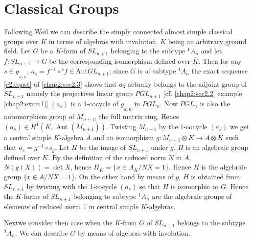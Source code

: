  \section {Classical Groups}\label{chap2:sec2.4}
 
 Following Weil \cite{keyW2} we can describe the simply connected almost
 simple classical groups over $K$ in terms of algebras with
 involution, $K$ being an arbitrary  ground field. Let $G$ be a $K$-form
 of $SL_{n+1}$ belonging to the subtype ${}^1 A_n$  and let $f :
 SL_{n+1} \longrightarrow G$ be the corresponding isomorphism defined
 over $\bar{K}$.  Then for any  $s \in g_{_{\bar{K}/K}}$, $a_s = f^{-1} \circ
 {}^s f \in  \text{Aut} GL _{n+1}$; since $G$ is of subtype  ${}^1 A_n$
 the exact sequence \ref{c2:eqast} of \ref{chap2:sec2.3} shows that
 $a_3$ actually belongs 
 to the adjoint group of $SL_{n+1}$ namely the projectives linear
 group $PGL _{n+1}$ [cf. \ref{chap2:sec2.2} example
   \ref{chap2:exam1}] $(a_s)$ is a 1-cocycle of 
 $g_{_{\bar{K}/K}}$ in  $PGL_n$. Now $PGL_n$ is also the automorphism
 group of $M_{n+1}$, the full matrix ring. Hence $(a_s) \in H^1 (K,
 \text{ Aut } (M_{n+1}))$. Twisting  $M_{n+1}$  by the 1-cocycle
 $(a_s)$ we get a central simple $K$-algebra $A$ and an isomorphism $g :
 M_{n+1} \otimes \bar{K} \longrightarrow A \otimes \bar{K}$ such
 that $a_s = g^{-1} \circ s_g$. Let $H$ be the image of $SL _{n+1}$ under
 $g$. $H$ is an algebraic group defined over $K$. By the definition of
 the reduced norm $N$ in $A$, $N (g(X)) = \det X$, hence $H_{\bar{K}}
 =\bigg\{ x \in  A_{\bar{K}} \bigg/  NX = 1 \bigg\}$. Hence $H$ is
 the algebraic group $\bigg\{ x \in  A \bigg / NX = 1 \bigg\}$. On
 the other hand by means of $g$, $H$ is obtained from $SL_{n+1}$ by
 twisting with the 1-cocycle $(a_s)$ so that $H$ is isomorphic to
 $G$. Hence the $K$-forms of $SL_{n+1}$ belonging to subtype
 ${}^1 A_n$ are the algebraic groups of elements of reduced norm 1
 in central simple $K$-algebras.  
 
 Next\pageoriginale we consider then case when the $K$-from $G$ of
 $SL_{n+1}$ belongs to the subtype ${}^2 A_n$. We can describe $G$
 by means of algebras with involution.   
 
